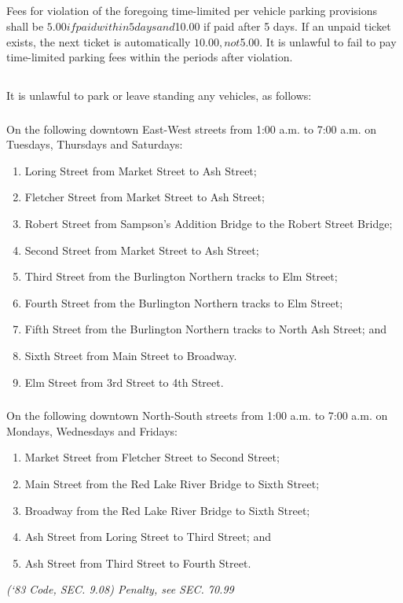\documentclass[code.tex]{subfiles}
\begin{document}
\subsection{}
Fees for violation of the foregoing time-limited per vehicle parking provisions shall be $5.00 if paid within 5 days and $10.00 if paid after 5 days. If an unpaid ticket exists, the next ticket is automatically $10.00, not $5.00.  It is unlawful to fail to pay time-limited parking fees within the periods after violation.
\subsection{}
It is unlawful to park or leave standing any vehicles, as follows:
\subsubsection{}
On the following downtown East-West streets from 1:00 a.m. to 7:00 a.m. on Tuesdays, Thursdays and Saturdays:
\begin{enumerate}[{\indent}a)]
\item Loring Street from Market Street to Ash Street;
\item Fletcher Street from Market Street to Ash Street;
\item Robert Street from Sampson’s Addition Bridge to the Robert Street Bridge;
\item Second Street from Market Street to Ash Street;
\item Third Street from the Burlington Northern tracks to Elm Street;
\item Fourth Street from the Burlington Northern tracks to Elm Street;
\item Fifth Street from the Burlington Northern tracks to North Ash Street; and
\item Sixth Street from Main Street to Broadway.
\item Elm Street from 3rd Street to 4th Street.
\end{enumerate}
\subsubsection{}
On the following downtown North-South streets from 1:00 a.m. to 7:00 a.m. on Mondays, Wednesdays and Fridays:
\begin{enumerate}[{\indent}a)]
\item Market Street from Fletcher Street to Second Street;
\item Main Street from the Red Lake River Bridge to Sixth Street;
\item Broadway from the Red Lake River Bridge to Sixth Street;
\item Ash Street from Loring Street to Third Street; and
\item Ash Street from Third Street to Fourth Street.
\end{enumerate}
\emph{(‘83 Code, SEC. 9.08)  Penalty, see SEC. 70.99}
\end{document}

